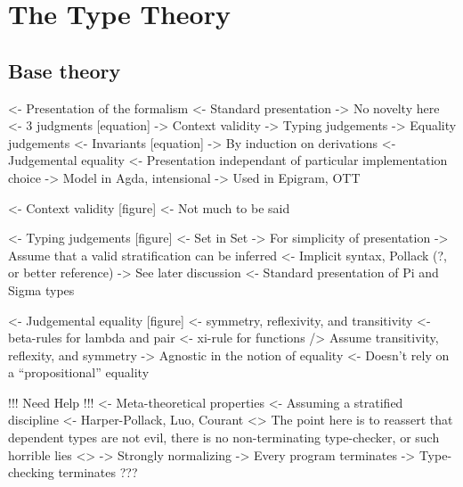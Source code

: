 \documentclass{article}
\newenvironment{structure}{\footnotesize\verbatim}{\endverbatim}
\begin{document}
\section{The Type Theory}

\subsection{Base theory}

\begin{structure}
<- Presentation of the formalism
    <- Standard presentation
        -> No novelty here
    <- 3 judgments [equation]
        -> Context validity
        -> Typing judgements
        -> Equality judgements
    <- Invariants [equation]
        -> By induction on derivations
    <- Judgemental equality
        <- Presentation independant of particular implementation choice
        -> Model in Agda, intensional
        -> Used in Epigram, OTT
\end{structure}

\begin{structure}
<- Context validity [figure]
    <- Not much to be said
\end{structure}

\begin{structure}
<- Typing judgements [figure]
    <- Set in Set
        -> For simplicity of presentation
        -> Assume that a valid stratification can be inferred
            <- Implicit syntax, Pollack (?, or better reference)
        -> See later discussion
    <- Standard presentation of Pi and Sigma types
\end{structure}

\begin{structure}
<- Judgemental equality [figure]
    <- symmetry, reflexivity, and transitivity
    <- beta-rules for lambda and pair
    <- xi-rule for functions
    /> Assume transitivity, reflexity, and symmetry
    -> Agnostic in the notion of equality
        <- Doesn't rely on a ``propositional'' equality
\end{structure}

\begin{structure}
!!! Need Help !!!
<- Meta-theoretical properties
    <- Assuming a stratified discipline
        <- Harper-Pollack, Luo, Courant
    <> The point here is to reassert that dependent types are not evil, 
       there is no non-terminating type-checker, or such horrible lies <>
    -> Strongly normalizing
        -> Every program terminates
    -> Type-checking terminates
    ???
\end{structure}
\end{document}
